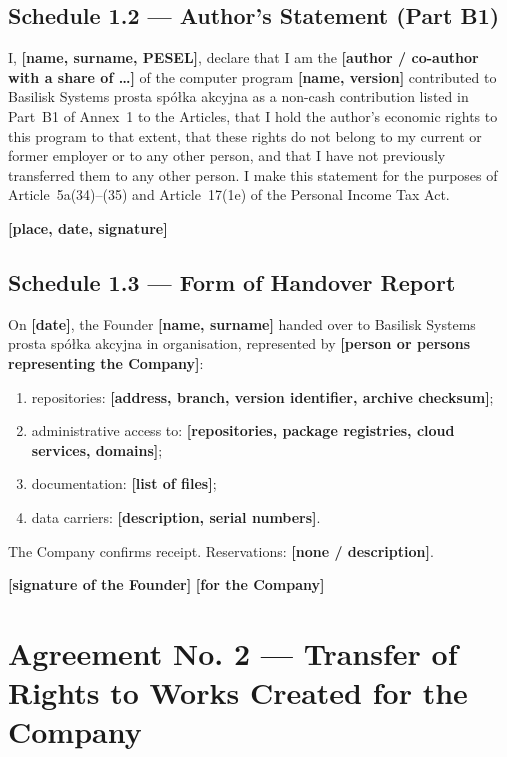 \documentclass[12pt,a4paper]{report}
\newcounter{paragraf}
\newcommand{\field}[1]{\textbf{[#1]}}
\newcommand{\CompanyFull}{Basilisk Systems prosta spółka akcyjna}
\begin{document}
\section*{Schedule 1.2 --- Author's Statement (Part B1)}

I, \field{name, surname, PESEL}, declare that I am the \field{author / co-author with a share of \ldots} of the computer program \field{name, version} contributed to \CompanyFull{} as a non-cash contribution listed in Part~B1 of Annex~1 to the Articles, that I hold the author's economic rights to this program to that extent, that these rights do not belong to my current or former employer or to any other person, and that I have not previously transferred them to any other person. I make this statement for the purposes of Article~5a(34)--(35) and Article~17(1e) of the Personal Income Tax Act.

\field{place, date, signature}

\section*{Schedule 1.3 --- Form of Handover Report}

On \field{date}, the Founder \field{name, surname} handed over to \CompanyFull{} in organisation, represented by \field{person or persons representing the Company}:

\begin{enumerate}
  \item repositories: \field{address, branch, version identifier, archive checksum};
  \item administrative access to: \field{repositories, package registries, cloud services, domains};
  \item documentation: \field{list of files};
  \item data carriers: \field{description, serial numbers}.
\end{enumerate}

The Company confirms receipt. Reservations: \field{none / description}.

\field{signature of the Founder} \hfill \field{for the Company}

\chapter*{Agreement No. 2 --- Transfer of Rights to Works Created for the Company}
\setcounter{paragraf}{0}
\end{document}
